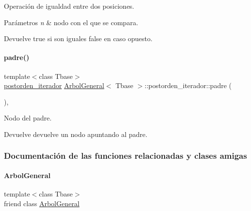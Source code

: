 Operación de igualdad entre dos posiciones. 


\begin{DoxyParams}{Parámetros}
{\em n} & nodo con el que se compara. \\
\hline
\end{DoxyParams}
\begin{DoxyReturn}{Devuelve}
true si son iguales false en caso opuesto. 
\end{DoxyReturn}
\hypertarget{classArbolGeneral_1_1postorden__iterador_a939b113299035ac4f56c1ebc8c7de763}{}\label{classArbolGeneral_1_1postorden__iterador_a939b113299035ac4f56c1ebc8c7de763} 
\paragraph{\texorpdfstring{padre()}{padre()}}
{\footnotesize\ttfamily template$<$class Tbase$>$ \\
\hyperlink{classArbolGeneral_1_1postorden__iterador}{postorden\+\_\+iterador} \hyperlink{classArbolGeneral}{Arbol\+General}$<$ Tbase $>$\+::postorden\+\_\+iterador\+::padre (\begin{DoxyParamCaption}{ }\end{DoxyParamCaption})\hspace{0.3cm}{\ttfamily [inline]}, {\ttfamily [private]}}



Nodo del padre. 

\begin{DoxyReturn}{Devuelve}
devuelve un nodo apuntando al padre. 
\end{DoxyReturn}


\subsubsection{Documentación de las funciones relacionadas y clases amigas}
\hypertarget{classArbolGeneral_1_1postorden__iterador_a9c06e31b7c3e0d4ee5b03003d32935a5}{}\label{classArbolGeneral_1_1postorden__iterador_a9c06e31b7c3e0d4ee5b03003d32935a5} 
\paragraph{\texorpdfstring{Arbol\+General}{ArbolGeneral}}
{\footnotesize\ttfamily template$<$class Tbase$>$ \\
friend class \hyperlink{classArbolGeneral}{Arbol\+General}\hspace{0.3cm}{\ttfamily [friend]}}



